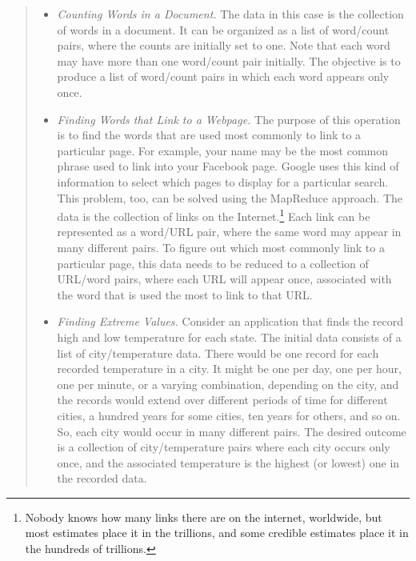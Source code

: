 \begin{quote}
\begin{itemize}
\item \emph{Counting Words in a Document.}  The data in this
case is the collection of words in a document.  It can be
organized as a list of word/count pairs, where the counts
are initially set to one.  Note that each word may have more
than one word/count pair initially.  
The objective is to produce a list of word/count pairs 
in which each word appears only once.
\item \emph{Finding Words that Link to a Webpage.}  The
purpose of this operation is to find the words that are used
most commonly to link to a particular page.  For example,
your name may be the most common phrase used to link into your
Facebook page.  Google uses this kind of information to select which
pages to display for a particular search.  This problem, too,
can be solved using the MapReduce approach.  The data is the
collection of links on the Internet.\footnote{Nobody knows how many
links there are on the internet, worldwide, 
but most estimates place it in the trillions, 
and some credible estimates place it in the hundreds of trillions. } 
Each link can be represented as a word/URL pair, 
where the same word may appear in many different pairs.
To figure out which most commonly link to a particular page,
this data needs to be reduced to a collection of
URL/word pairs, where each URL will appear once, associated
with the word that is used the most to link to that URL.
\item \emph{Finding Extreme Values.}  Consider
an application that finds the record high and low temperature
for each state.  The initial data consists of a list of
city/temperature data.  There would be one record for each
recorded temperature in a city. It might be one per day, 
one per hour, one per minute, or a varying combination,
depending on the city, and the records would extend over
different periods of time for different cities, 
a hundred years for some cities, ten years for others,
and so on. So, each city would occur in many different pairs.
The desired outcome is a collection of city/temperature
pairs where each city occurs only once, and the associated
temperature is the highest (or lowest) one in the recorded data.
\end{itemize}
\end{quote}


